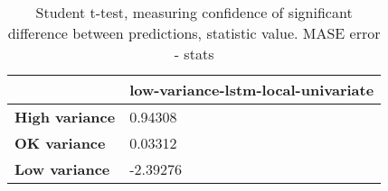 \begin{table}[H]
\centering
\caption{Student t-test, measuring confidence of significant difference between predictions, statistic value. MASE error - stats}
\label{table:ttest-stats-variance-experiments-MASE}
\begin{tabular}{ll}
\toprule
{} & low-variance-lstm-local-univariate \\
\midrule
\textbf{High variance} &                            0.94308 \\
\textbf{OK variance  } &                            0.03312 \\
\textbf{Low variance } &                           -2.39276 \\
\bottomrule
\end{tabular}
\end{table}
